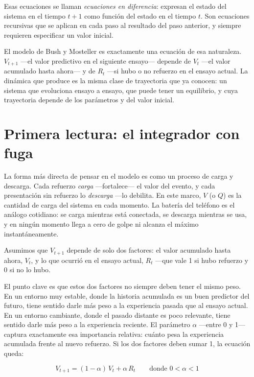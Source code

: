 \documentclass[
  letterpaper,
  DIV=11,
  numbers=noendperiod]{scrreprt}
\begin{document}
\begin{tcolorbox}[enhanced jigsaw, arc=.35mm, bottomrule=.15mm, breakable, colback=white, colframe=quarto-callout-note-color-frame, left=2mm, leftrule=.75mm, opacityback=0, rightrule=.15mm, toprule=.15mm]
Esas ecuaciones se llaman \emph{ecuaciones en diferencia}: expresan el
estado del sistema en el tiempo \(t+1\) como función del estado en el
tiempo \(t\). Son ecuaciones recursivas que se aplican en cada paso al
resultado del paso anterior, y siempre requieren especificar un valor
inicial.

El modelo de Bush y Mosteller es exactamente una ecuación de esa
naturaleza. \(V_{t+1}\) ---el valor predictivo en el siguiente ensayo---
depende de \(V_t\) ---el valor acumulado hasta ahora--- y de \(R_t\)
---si hubo o no refuerzo en el ensayo actual. La dinámica que produce es
la misma clase de trayectoria que ya conocen: un sistema que evoluciona
ensayo a ensayo, que puede tener un equilibrio, y cuya trayectoria
depende de los parámetros y del valor inicial.

\section{Primera lectura: el integrador con
fuga}\label{primera-lectura-el-integrador-con-fuga}

La forma más directa de pensar en el modelo es como un proceso de carga
y descarga. Cada refuerzo \emph{carga} ---fortalece--- el valor del
evento, y cada presentación sin refuerzo lo \emph{descarga} ---lo
debilita. En este marco, \(V\) (o \(Q\)) es la cantidad de carga del
sistema en cada momento. La batería del teléfono es el análogo
cotidiano: se carga mientras está conectada, se descarga mientras se
usa, y en ningún momento llega a cero de golpe ni alcanza el máximo
instantáneamente.

Asumimos que \(V_{t+1}\) depende de solo dos factores: el valor
acumulado hasta ahora, \(V_t\), y lo que ocurrió en el ensayo actual,
\(R_t\) ---que vale 1 si hubo refuerzo y 0 si no lo hubo.

El punto clave es que estos dos factores no siempre deben tener el mismo
peso. En un entorno muy estable, donde la historia acumulada es un buen
predictor del futuro, tiene sentido darle más peso a la experiencia
pasada que al ensayo actual. En un entorno cambiante, donde el pasado
distante es poco relevante, tiene sentido darle más peso a la
experiencia reciente. El parámetro \(\alpha\) ---entre 0 y 1--- captura
exactamente esa importancia relativa: cuánto pesa la experiencia
acumulada frente al nuevo refuerzo. Si los dos factores deben sumar 1,
la ecuación queda:

\[V_{t+1} = (1-\alpha)\,V_t + \alpha\,R_t \qquad \text{donde } 0 < \alpha < 1\]


\end{tcolorbox}
\end{document}
